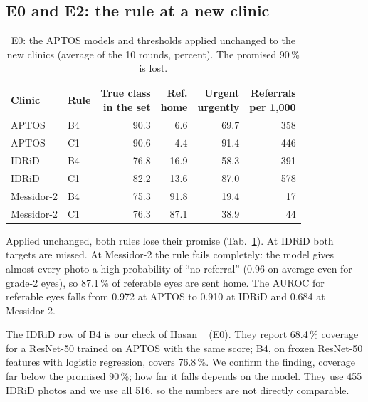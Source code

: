 \documentclass[10pt,twocolumn,letterpaper]{article}
\newcommand{\pct}{\,\%}
\begin{document}
\subsection{E0 and E2: the rule at a new clinic}
\begin{table}[t]\centering\small
\begin{adjustbox}{max width=\linewidth}\begin{tabular}{@{}llrrrr@{}}\toprule
Clinic & Rule & \shortstack{True class\\in the set} & \shortstack{Ref.\\home} & \shortstack{Urgent\\urgently} & \shortstack{Referrals\\per 1,000}\\\midrule
APTOS & B4 & 90.3 & 6.6 & 69.7 & 358\\
APTOS & C1 & 90.6 & 4.4 & 91.4 & 446\\
IDRiD & B4 & 76.8 & 16.9 & 58.3 & 391\\
IDRiD & C1 & 82.2 & 13.6 & 87.0 & 578\\
Messidor-2 & B4 & 75.3 & 91.8 & 19.4 & 17\\
Messidor-2 & C1 & 76.3 & 87.1 & 38.9 & 44\\\bottomrule
\end{tabular}\end{adjustbox}
\caption{E0: the APTOS models and thresholds applied unchanged to the new clinics (average of the 10 rounds, percent). The promised 90\pct{} is lost.}\label{tab:e0}
\end{table}
Applied unchanged, both rules lose their promise (Tab.~\ref{tab:e0}). At IDRiD both targets are missed. At Messidor-2 the rule fails completely: the model gives almost every photo a high probability of ``no referral'' (0.96 on average even for grade-2 eyes), so 87.1\pct{} of referable eyes are sent home. The AUROC for referable eyes falls from 0.972 at APTOS to 0.910 at IDRiD and 0.684 at Messidor-2.

The IDRiD row of B4 is our check of Hasan \etal~\cite{hasan} (E0). They report 68.4\pct{} coverage for a ResNet-50 trained on APTOS with the same score; B4, on frozen ResNet-50 features with logistic regression, covers 76.8\pct. We confirm the finding, coverage far below the promised 90\pct; how far it falls depends on the model. They use 455 IDRiD photos and we use all 516, so the numbers are not directly comparable.
\end{document}
